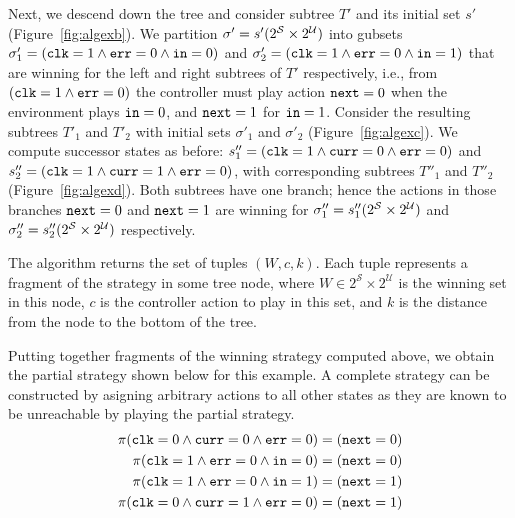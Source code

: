 Next, we descend down the tree and consider subtree $T'$ and its initial set $s'$ (Figure~\ref{fig:algexb}).  We partition $\sigma' = s'(2^{\mathcal{S}} \times 2^{\mathcal{U}})$ into gubsets $\sigma_1' = (\texttt{clk} = 1 \land \texttt{err} = 0 \land \texttt{in} = 0)$ and $\sigma_2' = (\texttt{clk} = 1 \land \texttt{err} = 0 \land \texttt{in} = 1)$ that are winning for the left and right subtrees of $T'$ respectively, i.e., from $(\texttt{clk} = 1 \land \texttt{err} = 0)$ the controller must play action $\texttt{next} = 0$ when the environment plays $\texttt{in} = 0$, and $\texttt{next} = 1$ for $\texttt{in} = 1$.  Consider the resulting subtrees $T'_1$ and $T'_2$ with initial sets $\sigma'_1$ and $\sigma'_2$ (Figure~\ref{fig:algexc}).  We compute successor states as before: $s''_1 = (\texttt{clk} = 1 \land \texttt{curr} = 0 \land \texttt{err} = 0)$ and $s''_2 = (\texttt{clk} = 1 \land \texttt{curr} = 1 \land \texttt{err} = 0)$, with corresponding subtrees $T''_1$ and $T''_2$ (Figure~\ref{fig:algexd}).  Both subtrees have one branch; hence the actions in those branches $\texttt{next} = 0$ and $\texttt{next} = 1$ are winning for $\sigma''_1 = s''_1(2^{\mathcal{S}} \times 2^{\mathcal{U}})$ and $\sigma''_2 = s''_2(2^{\mathcal{S}} \times 2^{\mathcal{U}})$ respectively.

The algorithm returns the set of tuples $(W, c, k)$.  Each tuple represents a fragment of the strategy in some tree node, where $W \in 2^{\mathcal{S}} \times 2^{\mathcal{U}}$ is the winning set in this node, $c$ is the controller action to play in this set, and $k$ is the distance from the node to the bottom of the tree.

Putting together fragments of the winning strategy computed above, we obtain the partial strategy shown below for this example. A complete strategy can be constructed by asigning arbitrary actions to all other states as they are known to be unreachable by playing the partial strategy.
\begin{align*}
    \pi(\texttt{clk} = 0 \land \texttt{curr} = 0 \land \texttt{err} = 0) &= (\texttt{next} = 0) \\
    \pi(\texttt{clk} = 1 \land \texttt{err} = 0 \land \texttt{in} = 0) &= (\texttt{next} = 0) \\
    \pi(\texttt{clk} = 1 \land \texttt{err} = 0 \land \texttt{in} = 1) &= (\texttt{next} = 1) \\
    \pi(\texttt{clk} = 0 \land \texttt{curr} = 1 \land \texttt{err} = 0) &= (\texttt{next} = 1)
\end{align*}





